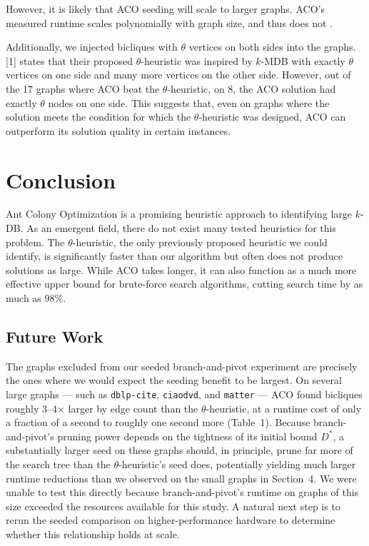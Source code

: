 \documentclass{article}
\begin{document}
However, it is likely that ACO seeding will scale to larger graphs. ACO's measured runtime scales polynomially with graph size, and thus does not .

Additionally, we injected bicliques with $\theta$ vertices on both sides into the graphs. [1] states that their proposed $\theta$-heuristic was inspired by $k$-MDB with exactly $\theta$ vertices on one side and many more vertices on the other side. However, out of the 17 graphs where ACO beat the $\theta$-heuristic, on 8, the ACO solution had exactly $\theta$ nodes on one side. This suggests that, even on graphs where the solution meets the condition for which the $\theta$-heuristic was designed, ACO can outperform its solution quality in certain instances.

\section{Conclusion}

Ant Colony Optimization is a promising heuristic approach to identifying large $k$-DB. As an emergent field, there do not exist many tested heuristics for this problem. The $\theta$-heuristic, the only previously proposed heuristic we could identify, is significantly faster than our algorithm but often does not produce solutions as large. While ACO takes longer, it can also function as a much more effective upper bound for brute-force search algorithms,
cutting search time by as much as $98\%$.

\subsection{Future Work}

The graphs excluded from our seeded branch-and-pivot experiment are precisely the ones where we would expect the seeding benefit to be largest. On several large graphs --- such as \texttt{dblp-cite}, \texttt{ciaodvd}, and \texttt{matter} --- ACO found bicliques roughly 3--4$\times$ larger by edge count than the $\theta$-heuristic, at a runtime cost of only a fraction of a second to roughly one second more (Table~1). Because branch-and-pivot's pruning power depends on the tightness of its initial bound $D^*$, a substantially larger seed on these graphs should, in principle, prune far more of the search tree than the $\theta$-heuristic's seed does, potentially yielding much larger runtime reductions than we observed on the small graphs in Section~4. We were unable to test this directly because branch-and-pivot's runtime on graphs of this size exceeded the resources available for this study. A natural next step is to rerun the seeded comparison on higher-performance hardware to determine whether this relationship holds at scale.
\end{document}
